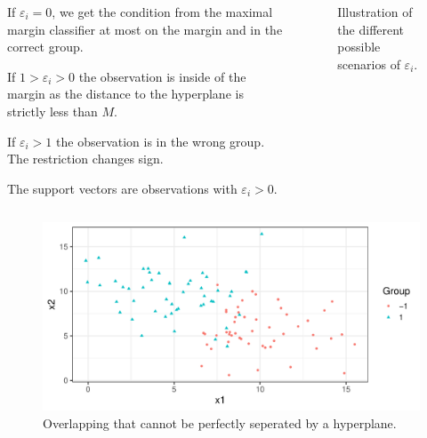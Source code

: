 \documentclass[aspectratio=169,10pt]{beamer}
\begin{document}
\begin{frame}{\secname}{\subsecname}
  \begin{columns}
    \begin{column}{.5\textwidth}
    If $\varepsilon_i = 0$, we get the condition from the maximal margin classifier at most on the margin and in the correct group.
    \newline
    
    If $1 > \varepsilon_i > 0$ the observation is inside of the margin as the distance to the hyperplane is strictly less than $M$. 
    \newline

    If $\varepsilon_i > 1$ the observation is in the wrong group. The restriction changes sign.
    \newline

    The support vectors are observations with $\varepsilon_i > 0$.
    \end{column}
    \begin{column}{.5\textwidth}
      \begin{figure}
        \centering
        \caption{Illustration of the different possible scenarios of $\varepsilon_i$.}
      \end{figure}
    \end{column} 
  \end{columns}
\end{frame}

\begin{frame}{\secname}{\subsecname}
  \begin{figure}
    \includegraphics[width=.6\textwidth]{scripts/output/osh_data_overlap.pdf}
    \caption{Overlapping that cannot be perfectly seperated by a hyperplane.}
  \end{figure}
\end{frame}
\end{document}
